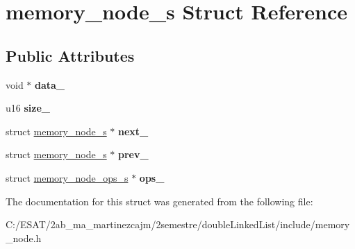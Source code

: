 \hypertarget{structmemory__node__s}{}\section{memory\+\_\+node\+\_\+s Struct Reference}
\label{structmemory__node__s}
\subsection*{Public Attributes}
\begin{DoxyCompactItemize}
\item 
\mbox{\label{structmemory__node__s_ae5c51b455c45732951edc8b5f9e205cf}} 
void $\ast$ {\bfseries data\+\_\+}
\item 
\mbox{\label{structmemory__node__s_aa8fbd1b47457157824d0e4bbb99f2721}} 
u16 {\bfseries size\+\_\+}
\item 
\mbox{\label{structmemory__node__s_a56e5430d28054fb5a0281bf3bc409acf}} 
struct \hyperlink{structmemory__node__s}{memory\+\_\+node\+\_\+s} $\ast$ {\bfseries next\+\_\+}
\item 
\mbox{\label{structmemory__node__s_a2d4ffa8c004f317082d237f305029886}} 
struct \hyperlink{structmemory__node__s}{memory\+\_\+node\+\_\+s} $\ast$ {\bfseries prev\+\_\+}
\item 
\mbox{\label{structmemory__node__s_a14e02a1ffddcb770d92d4a58658e35b9}} 
struct \hyperlink{structmemory__node__ops__s}{memory\+\_\+node\+\_\+ops\+\_\+s} $\ast$ {\bfseries ops\+\_\+}
\end{DoxyCompactItemize}


The documentation for this struct was generated from the following file\+:\begin{DoxyCompactItemize}
\item 
C\+:/\+E\+S\+A\+T/2ab\+\_\+ma\+\_\+martinezcajm/2semestre/double\+Linked\+List/include/memory\+\_\+node.\+h\end{DoxyCompactItemize}
